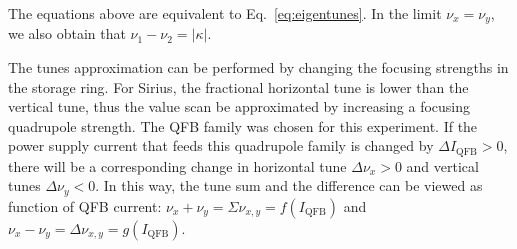 The equations above are equivalent to Eq.~\eqref{eq:eigentunes}. In the limit $\nu_x = \nu_y$, we also obtain that $\nu_1 - \nu_2 = |\kappa|$.

The tunes approximation can be performed by changing the focusing strengths in the storage ring. For Sirius, the fractional horizontal tune is lower than the vertical tune, thus the value scan be approximated by increasing a focusing quadrupole strength. The QFB family was chosen for this experiment. If the power supply current that feeds this quadrupole family is changed by $\Delta I_{\mathrm{QFB}}>0$, there will be a corresponding change in horizontal tune $\Delta\nu_x > 0$ and vertical tunes $\Delta\nu_y < 0$. In this way, the tune sum and the difference can be viewed as function of QFB current: $\nu_x + \nu_y = \Sigma \nu_{x, y} = f\left(I_{\mathrm{QFB}}\right)$ and $\nu_x - \nu_y = \Delta \nu_{x, y} = g\left(I_{\mathrm{QFB}}\right)$.

